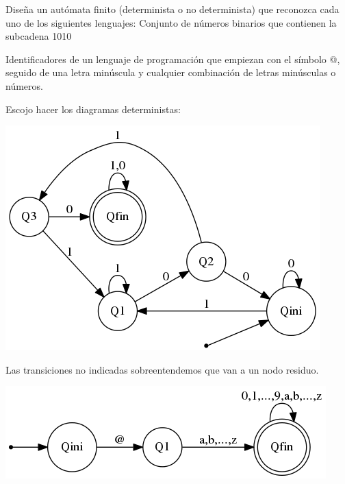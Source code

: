 \begin{problem}[2]
Diseña un autómata finito (determinista o no determinista) que reconozca cada uno de los siguientes lenguajes:
\ppart Conjunto de números binarios que contienen la subcadena 1010

\ppart Identificadores de un lenguaje de programación que empiezan con el símbolo @, seguido de una letra minúscula y cualquier combinación de letras minúsculas o números.

\solution
Escojo hacer los diagramas deterministas:\\
\spart
\begin{center}
\includegraphics[scale=0.75]{tex/ejerciciosHoja1/automata_2a.png}
\end{center}

\spart
 Las transiciones no indicadas sobreentendemos que van a un nodo residuo.

\begin{center}
\includegraphics[scale=0.75]{tex/ejerciciosHoja1/automata_2b.png}
\end{center}

 

\end{problem}


